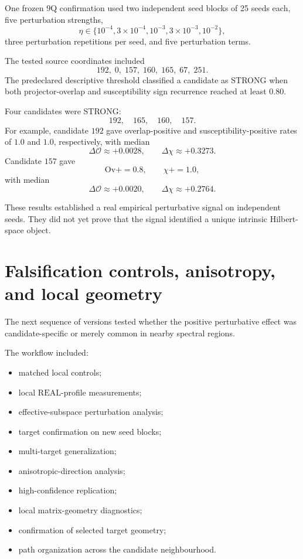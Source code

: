 \documentclass[11pt,a4paper]{article}
\newcommand{\Real}{\mathrm{REAL}}
\begin{document}
One frozen 9Q confirmation used two independent seed blocks of 25 seeds each,
five perturbation strengths,
\[
\eta\in\{10^{-4},3\times10^{-4},10^{-3},3\times10^{-3},10^{-2}\},
\]
three perturbation repetitions per seed, and five perturbation terms.

The tested source coordinates included
\[
192,\;0,\;157,\;160,\;165,\;67,\;251.
\]
The predeclared descriptive threshold classified a candidate as STRONG when
both projector-overlap and susceptibility sign recurrence reached at least
\(0.80\).

Four candidates were STRONG:
\[
192,\quad165,\quad160,\quad157.
\]
For example, candidate \(192\) gave overlap-positive and
susceptibility-positive rates of \(1.0\) and \(1.0\), respectively, with
median
\[
\Delta\mathcal O\approx+0.0028,
\qquad
\Delta\chi\approx+0.3273.
\]
Candidate \(157\) gave
\[
\text{Ov+}=0.8,
\qquad
\chi+=1.0,
\]
with median
\[
\Delta\mathcal O\approx+0.0020,
\qquad
\Delta\chi\approx+0.2764.
\]

These results established a real empirical perturbative signal on independent
seeds.  They did not yet prove that the signal identified a unique intrinsic
Hilbert-space object.

\section{Falsification controls, anisotropy, and local geometry}

The next sequence of versions tested whether the positive perturbative effect
was candidate-specific or merely common in nearby spectral regions.

The workflow included:

\begin{itemize}
\item matched local controls;
\item local \(\Real\)-profile measurements;
\item effective-subspace perturbation analysis;
\item target confirmation on new seed blocks;
\item multi-target generalization;
\item anisotropic-direction analysis;
\item high-confidence replication;
\item local matrix-geometry diagnostics;
\item confirmation of selected target geometry;
\item path organization across the candidate neighbourhood.
\end{itemize}
\end{document}
